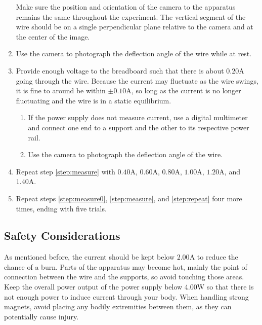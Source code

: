 \begin{enumerate}
	Make sure the position and orientation of the camera to the apparatus remains the same throughout the experiment.
	The vertical segment of the wire should be on a single perpendicular plane relative to the camera and at the center of the image.
	\item Use the camera to photograph the deflection angle of the wire while at rest. \label{step:measure0}
	\item Provide enough voltage to the breadboard such that there is about $0.20\si{\ampere}$ going through the wire.
	Because the current may fluctuate as the wire swings, it is fine to around be within $\pm0.10\si{\ampere}$, so long as the current is no longer fluctuating and the wire is in a static equilibrium. \label{step:measure}
	\vspace{-1em} %
	\begin{enumerate}
		\item If the power supply does not measure current, use a digital multimeter and connect one end to a support and the other to its respective power rail.
		\item Use the camera to photograph the deflection angle of the wire. 
	\end{enumerate}
	\item Repeat step \ref{step:measure} with $0.40\si{\ampere}$, $0.60\si{\ampere}$, $0.80\si{\ampere}$, $1.00\si{\ampere}$, $1.20\si{\ampere}$, and $1.40\si{\ampere}$.\label{step:repeat}
	\item Repeat steps \ref{step:measure0}, \ref{step:measure}, and \ref{step:repeat} four more times, ending with five trials.
\end{enumerate}

\subsection*{Safety Considerations}

As mentioned before, the current should be kept below $2.00\si{\ampere}$ to reduce the chance of a burn.
Parts of the apparatus may become hot, mainly the point of connection between the wire and the supports, so avoid touching those areas.
Keep the overall power output of the power supply below $4.00\si{\watt}$ so that there is not enough power to induce current through your body.
When handling strong magnets, avoid placing any bodily extremities between them, as they can potentially cause injury.
